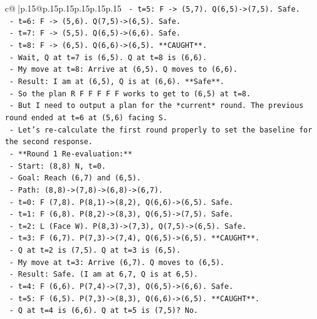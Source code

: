 \documentclass{article}
\begin{document}
{\begin{supertabular}{c@{$\;$}|p{.15\linewidth}@{}p{.15\linewidth}p{.15\linewidth}p{.15\linewidth}p{.15\linewidth}p{.15\linewidth}}
{{{\texttt{    {-} t=5: F {-}> (5,7). Q(6,5){-}>(7,5). Safe.} \\
\texttt{    {-} t=6: F {-}> (5,6). Q(7,5){-}>(6,5). Safe.} \\
\texttt{    {-} t=7: F {-}> (5,5). Q(6,5){-}>(6,6). Safe.} \\
\texttt{    {-} t=8: F {-}> (6,5). Q(6,6){-}>(6,5). **CAUGHT**.} \\
\texttt{  {-} Wait, Q at t=7 is (6,5). Q at t=8 is (6,6).} \\
\texttt{  {-} My move at t=8: Arrive at (6,5). Q moves to (6,6).} \\
\texttt{  {-} Result: I am at (6,5), Q is at (6,6). **Safe**.} \\
\texttt{  {-} So the plan R F F F F F works to get to (6,5) at t=8.} \\
\texttt{  {-} But I need to output a plan for the *current* round. The previous round ended at t=6 at (5,6) facing S.} \\
\texttt{  {-} Let's re{-}calculate the first round properly to set the baseline for the second response.} \\
\texttt{  {-} **Round 1 Re{-}evaluation:**} \\
\texttt{    {-} Start: (8,8) N, t=0.} \\
\texttt{    {-} Goal: Reach (6,7) and (6,5).} \\
\texttt{    {-} Path: (8,8){-}>(7,8){-}>(6,8){-}>(6,7).} \\
\texttt{    {-} t=0: F (7,8). P(8,1){-}>(8,2), Q(6,6){-}>(6,5). Safe.} \\
\texttt{    {-} t=1: F (6,8). P(8,2){-}>(8,3), Q(6,5){-}>(7,5). Safe.} \\
\texttt{    {-} t=2: L (Face W). P(8,3){-}>(7,3), Q(7,5){-}>(6,5). Safe.} \\
\texttt{    {-} t=3: F (6,7). P(7,3){-}>(7,4), Q(6,5){-}>(6,5). **CAUGHT**.} \\
\texttt{      {-} Q at t=2 is (7,5). Q at t=3 is (6,5).} \\
\texttt{      {-} My move at t=3: Arrive (6,7). Q moves to (6,5).} \\
\texttt{      {-} Result: Safe. (I am at 6,7, Q is at 6,5).} \\
\texttt{    {-} t=4: F (6,6). P(7,4){-}>(7,3), Q(6,5){-}>(6,6). Safe.} \\
\texttt{    {-} t=5: F (6,5). P(7,3){-}>(8,3), Q(6,6){-}>(6,5). **CAUGHT**.} \\
\texttt{      {-} Q at t=4 is (6,6). Q at t=5 is (7,5)? No.} \\
}}}
\end{supertabular}}
\end{document}
